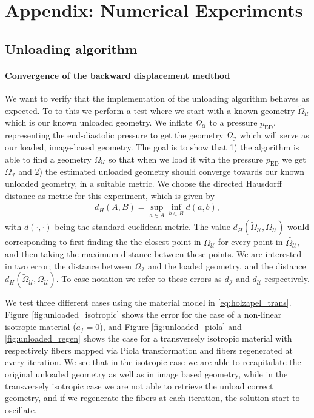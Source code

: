 \appendix
\chapter{Appendix: Numerical Experiments}

\section{Unloading algorithm}
\subsubsection{Convergence of the backward displacement medthod}
We want to verify that the implementation of the unloading algorithm
behaves as expected. To to this we perform a test where we start with
a known geometry $\tilde{\Omega}_{\mathcal{U}}$ which is our known
unloaded geometry. We inflate $\tilde{\Omega}_{\mathcal{U}}$ to a
pressure $p_{\mathrm{ED}}$, representing the end-diastolic pressure to
get the geometry $\Omega_{\mathcal{I}}$ which will serve as our loaded,
image-based geometry. The goal is to show that 1) the algorithm is able
to find a geometry $\Omega_{\mathcal{U}}$ so that when we load it with
the pressure $p_{\mathrm{ED}}$ we get $\Omega_{\mathcal{I}}$ and 2)
the estimated unloaded geometry should converge towards our known
unloaded geometry, in a suitable metric. We choose the directed
Hausdorff distance \cite{huttenlocher1993comparing} as metric for this
experiment, which is given by
\begin{align}
  d_H(A, B) = \sup_{a \in A} \inf_{b \in B} d(a,b), 
\end{align}
with $d(\cdot, \cdot)$ being the standard euclidean metric. 
The value $d_H(\tilde{\Omega}_{\mathcal{U}}, \Omega_{\mathcal{U}})$
would corresponding to first finding the the closest point in $\Omega_{\mathcal{U}}$ 
for every point in $\tilde{\Omega_{\mathcal{U}}}$, and then taking the
maximum distance between these points. We are interested in two error;
the distance between $\Omega_{\mathcal{I}}$ and the loaded geometry,
and the distance $d_H(\tilde{\Omega}_{\mathcal{U}},
\Omega_{\mathcal{U}})$. To ease notation we refer to these errors as
$d_{\mathcal{I}}$ and $d_{\mathcal{U}}$ respectively.


We test three different cases using the material model in \eqref{eq:holzapel_trans}.
Figure \ref{fig:unloaded_isotropic} shows the error for the case of a
non-linear isotropic material ($a_f = 0$), and Figure
\ref{fig:unloaded_piola} and \ref{fig:unloaded_regen} shows the case
for a transversely isotropic material with respectively fibers mapped
via Piola transformation and fibers regenerated at every iteration.
We see that in the isotropic case we are able to recapitulate the
original unloaded geometry as well as in image based geometry, while
in the transversely isotropic case we are not able to retrieve the
unload correct geometry, and if we regenerate the fibers at each
iteration, the solution start to oscillate. 


